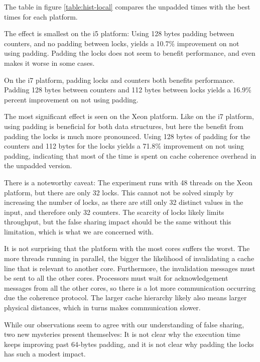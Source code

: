 The table in figure \ref{table:hist-local} compares the unpadded times with the
best times for each platform.

The effect is smallest on the i5 platform: Using 128 bytes padding between
counters, and no padding between locks, yields a 10.7\% improvement on not using
padding. Padding the locks does not seem to benefit performance, and even makes
it worse in some cases.

On the i7 platform, padding locks and counters both benefits performance.
Padding 128 bytes between counters and 112 bytes between locks yields a 16.9\%
percent improvement on not using padding.

The most significant effect is seen on the Xeon platform. Like on the i7
platform, using padding is beneficial for both data structures, but here the
benefit from padding the locks is much more pronounced. Using 128 bytes of
padding for the counters and 112 bytes for the locks yields a 71.8\% improvement
on not using padding, indicating that most of the time is spent on cache
coherence overhead in the unpadded version.

There is a noteworthy caveat: The experiment runs with 48 threads on the Xeon
platform, but there are only 32 locks.
This cannot not be solved simply by increasing the
number of locks, as there are still only 32 distinct values in the input, and
therefore only 32 counters.
The scarcity of locks likely limits
throughput, but the false sharing impact should be the same without
this limitation, which is what we are concerned with.

It is not surprising that the platform with the most cores suffers the worst.
The more threads running in parallel, the bigger the likelihood of invalidating
a cache line that is relevant to another core. Furthermore, the invalidation
messages must be sent to all the other cores. Processors must wait for
acknowledgement messages from all the other cores, so there is a lot more
communication occurring due the coherence protocol. The larger cache hierarchy
likely also means larger physical distances, which in turns makes communication
slower.

While our observations seem to agree with our understanding of false sharing,
two new mysteries present themselves: It is not clear why the execution time
keeps improving past 64-bytes padding, and it is not clear why padding the locks
has such a modest impact.

